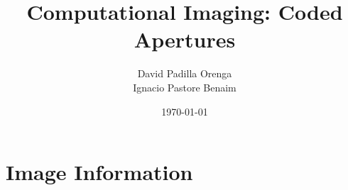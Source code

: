 \documentclass[a4paper,10pt]{article}
\title{Computational Imaging: Coded Apertures}
\author{David Padilla Orenga \\ Ignacio Pastore Benaim}
\date{\today}
\begin{document}
\maketitle
\thispagestyle{empty}
\newpage
\setcounter{page}{1}

\section{Image Information}
\end{document}
